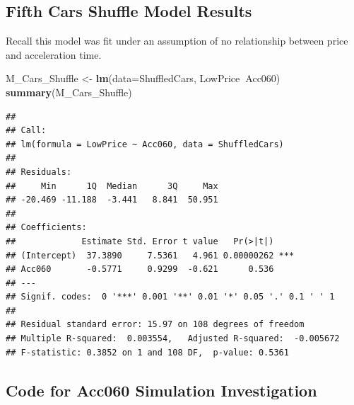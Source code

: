 \documentclass[]{book}
\newenvironment{Shaded}{\begin{snugshade}}{\end{snugshade}}
\newcommand{\KeywordTok}[1]{\textcolor[rgb]{0.13,0.29,0.53}{\textbf{#1}}}
\newcommand{\DataTypeTok}[1]{\textcolor[rgb]{0.13,0.29,0.53}{#1}}
\newcommand{\StringTok}[1]{\textcolor[rgb]{0.31,0.60,0.02}{#1}}
\newcommand{\OperatorTok}[1]{\textcolor[rgb]{0.81,0.36,0.00}{\textbf{#1}}}
\newcommand{\NormalTok}[1]{#1}
\begin{document}
\subsection{Fifth Cars Shuffle Model
Results}\label{fifth-cars-shuffle-model-results}

Recall this model was fit under an assumption of no relationship between
price and acceleration time.

\begin{Shaded}
\begin{Highlighting}[]
\NormalTok{M_Cars_Shuffle <-}\StringTok{ }\KeywordTok{lm}\NormalTok{(}\DataTypeTok{data=}\NormalTok{ShuffledCars, LowPrice}\OperatorTok{~}\NormalTok{Acc060)}
\KeywordTok{summary}\NormalTok{(M_Cars_Shuffle)}
\end{Highlighting}
\end{Shaded}

\begin{verbatim}
## 
## Call:
## lm(formula = LowPrice ~ Acc060, data = ShuffledCars)
## 
## Residuals:
##     Min      1Q  Median      3Q     Max 
## -20.469 -11.188  -3.441   8.841  50.951 
## 
## Coefficients:
##             Estimate Std. Error t value   Pr(>|t|)    
## (Intercept)  37.3890     7.5361   4.961 0.00000262 ***
## Acc060       -0.5771     0.9299  -0.621      0.536    
## ---
## Signif. codes:  0 '***' 0.001 '**' 0.01 '*' 0.05 '.' 0.1 ' ' 1
## 
## Residual standard error: 15.97 on 108 degrees of freedom
## Multiple R-squared:  0.003554,   Adjusted R-squared:  -0.005672 
## F-statistic: 0.3852 on 1 and 108 DF,  p-value: 0.5361
\end{verbatim}

\subsection{Code for Acc060 Simulation
Investigation}\label{code-for-acc060-simulation-investigation}
\end{document}

